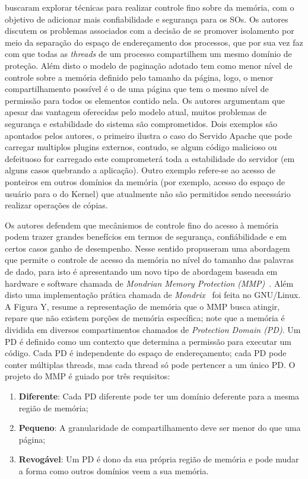 \cite{mmp} buscaram explorar técnicas para realizar controle fino sobre da
memória, com o objetivo de adicionar mais confiabilidade e segurança para os
SOs. Os autores discutem os problemas associados com a decisão de se promover
isolamento por meio da separação do espaço de endereçamento dos processos, que
por sua vez faz com que todas as \emph{threads} de um processo compartilhem um
mesmo domínio de proteção. Além disto o modelo de paginação adotado tem como
menor nível de controle sobre a memória definido pelo tamanho da página, logo,
o menor compartilhamento possível é o de uma página que tem o mesmo nível de
permissão para todos os elementos contido nela. Os autores argumentam que
apesar das vantagem oferecidas pelo modelo atual, muitos problemas de segurança
e estabilidade do sistema são comprometidos. Dois exemplos são apontados pelos
autores, o primeiro ilustra o caso do Servido Apache que pode carregar
multiplos plugins externos, contudo, se algum código malicioso ou defeituoso
for carregado este comprometerá toda a estabilidade do servidor (em alguns
casos quebrando a aplicação). Outro exemplo refere-se ao acesso de ponteiros em
outros domínios da memória (por exemplo, acesso do espaço de usuário para o do
Kernel) que atualmente não são permitidos sendo necessário realizar operações
de cópias.


Os autores defendem que mecânismos de controle fino do acesso à memória podem
trazer grandes benefícios em termos de segurança, confiábilidade e em certos
casos ganho de desempenho. Nesse sentido \cite{mmp} propuseram uma abordagem
que permite o controle de acesso da memória no nível do tamanho das palavras de
dado, para isto é apresentando um novo tipo de abordagem baseada em hardware e
software chamada de \emph{Mondrian Memory Protection (MMP)}~\citep{mmp}. Além
disto uma implementação prática chamada de \emph{Mondrix}~\cite{mondrix} foi
feita no GNU/Linux. A Figura Y, resume a representação de memória que o MMP
busca atingir, repare que não existem porções de memória específica; note que a
memória é dividida em diversos compartimentos chamados de \emph{Protection
Domain (PD)}. Um PD é definido como um contexto que determina a permissão para
executar um código. Cada PD é independente do espaço de endereçamento; cada PD
pode conter múltiplas threads, mas cada thread só pode pertencer a um único PD.
O projeto do MMP é guiado por três requisitos:

\begin{enumerate}
	\item \textbf{Diferente}: Cada PD diferente pode ter um domínio deferente
				para a mesma região de memória;
	\item \textbf{Pequeno}: A granularidade de compartilhamento deve ser menor
				do que uma página;
	\item \textbf{Revogável}: Um PD é dono da sua própria região de memória e
				pode mudar a forma como outros domínios veem a sua memória.
\end{enumerate}

